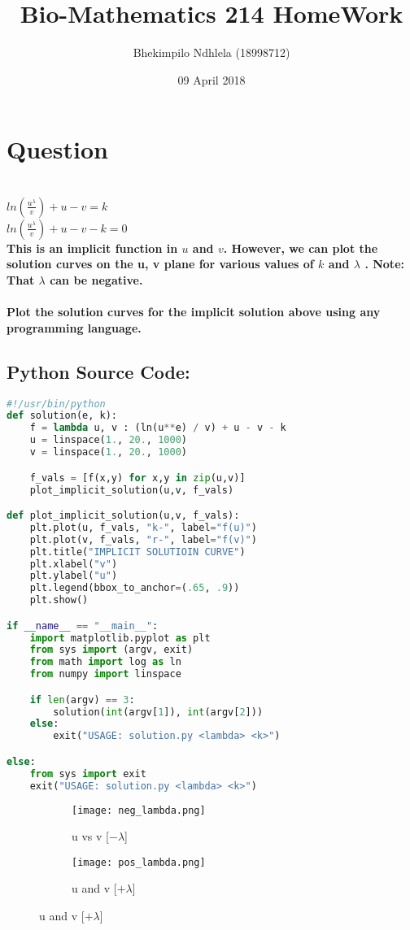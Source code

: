\documentclass[8]{article}
\title{Bio-Mathematics 214 HomeWork}
\author{Bhekimpilo Ndhlela (18998712)}
\date{09 April 2018}
\begin{document}
\maketitle
\section*{Question}
\textbf{\\$ln(\frac{u^\lambda}{v}) + u - v = k$\\ $ln(\frac{u^\lambda}{v}) + u - v  - k = 0$\\
This is an implicit function in $u$ and $v$. However, we can plot the solution curves on the u, v plane for various values of $k$ and $\lambda$ . Note: That $\lambda$ can be negative.\\ \\
Plot the solution curves for the implicit solution above using any programming language.
}

\pagebreak
\subsection*{Python Source Code:}
\begin{lstlisting}[language=Python]
#!/usr/bin/python
def solution(e, k):
    f = lambda u, v : (ln(u**e) / v) + u - v - k
    u = linspace(1., 20., 1000)
    v = linspace(1., 20., 1000)

    f_vals = [f(x,y) for x,y in zip(u,v)]
    plot_implicit_solution(u,v, f_vals)

def plot_implicit_solution(u,v, f_vals):
    plt.plot(u, f_vals, "k-", label="f(u)")
    plt.plot(v, f_vals, "r-", label="f(v)")
    plt.title("IMPLICIT SOLUTIOIN CURVE")
    plt.xlabel("v")
    plt.ylabel("u")
    plt.legend(bbox_to_anchor=(.65, .9))
    plt.show()

if __name__ == "__main__":
    import matplotlib.pyplot as plt
    from sys import (argv, exit)
    from math import log as ln
    from numpy import linspace

    if len(argv) == 3:
        solution(int(argv[1]), int(argv[2]))
    else:
        exit("USAGE: solution.py <lambda> <k>")

else:
    from sys import exit
    exit("USAGE: solution.py <lambda> <k>")

\end{lstlisting}

\pagebreak
\begin{figure}[h!]
  \centering
  \begin{subfigure}{\linewidth}
    \texttt{[image: neg\_lambda.png]}
    \caption{u vs v [$-\lambda$] }
  \end{subfigure}

  \begin{subfigure}{\linewidth}
    \texttt{[image: pos\_lambda.png]}
    \caption{u and v [$+\lambda$] }
  \end{subfigure}
\end{figure}
\end{document}
